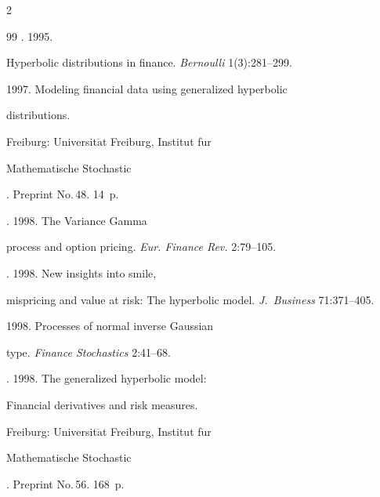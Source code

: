\begin{multicols}{2}
{{\begin{thebibliography}{99}
 . 1995. 


Hyperbolic distributions in finance. \textit{Bernoulli} 1(3):281--299.







 1997. Modeling financial data using generalized hyperbolic


distributions. 


{Freiburg: Universit$\ddot{\mbox{a}}$t Freiburg, Institut f$\ddot{\mbox{u}}$r 


Mathematische Stochastic}. Preprint No.\,48. 14~p.







. 1998. The Variance Gamma


process and option pricing. \textit{Eur. Finance Rev.} 2:79--105.







. 1998. New insights into smile,


mispricing and value at risk: The hyperbolic model. \textit{J.~Business} 71:371--405.







 1998. Processes of normal inverse Gaussian


type. \textit{Finance Stochastics} 2:41--68.







. 1998. The generalized hyperbolic model:


Financial derivatives and risk measures. 


{Freiburg: Universit$\ddot{\mbox{a}}$t Freiburg, Institut f$\ddot{\mbox{u}}$r 


Mathematische Stochastic}. Preprint No.\,56. 168~p.








\end{thebibliography}}}
\end{multicols}
